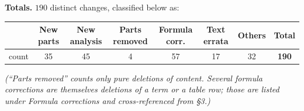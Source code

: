 \documentclass[11pt]{article}
\begin{document}
\vspace{0.5em}
\noindent\textbf{Totals.} $190$ distinct changes, classified below as:
\begin{center}\small
\begin{tabular}{lccccccc}
\toprule
 & New parts & New analysis & Parts removed & Formula corr. & Text errata & Others & \textbf{Total}\\
\midrule
count & 35 & 45 & 4 & 57 & 17 & 32 & \textbf{190}\\
\bottomrule
\end{tabular}
\end{center}
\emph{(``Parts removed'' counts only pure deletions of content. Several formula corrections
are themselves deletions of a term or a table row; those are listed under Formula corrections
and cross-referenced from \S3.)}

\end{document}
